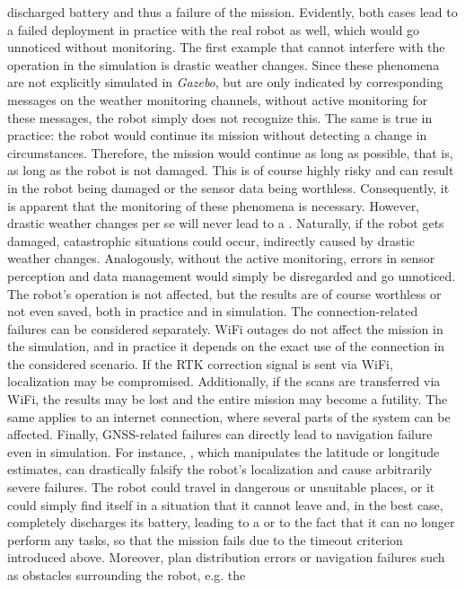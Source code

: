 \documentclass[english, master, utf8]{base/thesis_KBS}
\newcommand{\code}{\collectverb{\codebox}}
\begin{document}
discharged battery and thus a failure of the mission. Evidently, both cases lead to a failed deployment in practice with the real robot as well, which would go unnoticed without
monitoring. The first example that cannot interfere with the operation in the simulation is drastic weather changes. Since these phenomena are not explicitly simulated in
\textit{Gazebo}, but are only indicated by corresponding messages on the weather monitoring channels, without active monitoring for these messages, the robot simply does not recognize
this. The same is true in practice: the robot would continue its mission without detecting a change in circumstances. Therefore, the mission would continue as long as possible, that
is, as long as the robot is not damaged. This is of course highly risky and can result in the robot being damaged or the sensor data being worthless. Consequently, it is apparent that
the monitoring of these phenomena is necessary. However, drastic weather changes per se will never lead to a \code{CATASTROPHE}. Naturally, if the robot gets damaged, catastrophic
situations could occur, indirectly caused by drastic weather changes. Analogously, without the active monitoring, errors in sensor perception and data management would simply be
disregarded and go unnoticed. The robot's operation is not affected, but the results are of course worthless or not even saved, both in practice and in simulation. The
connection-related failures can be considered separately. WiFi outages do not affect the mission in the simulation, and in practice it depends on the exact use of the connection in
the considered scenario. If the RTK correction signal is sent via WiFi, localization may be compromised.  Additionally, if the scans are transferred via WiFi, the results may be lost
and the entire mission may become a futility. The same applies to an internet connection, where several parts of the system can be affected. Finally, GNSS-related failures can
directly lead to navigation failure even in simulation. For instance, \code{/toggle_simulated_teleport}, which manipulates the latitude or longitude estimates, can drastically
falsify the robot's localization and cause arbitrarily severe failures. The robot could travel in dangerous or unsuitable places, or it could simply find itself in a situation that it
cannot leave and, in the best case, completely discharges its battery, leading to a \code{CATASTROPHE} or to the fact that it can no longer perform any tasks, so that the mission fails
due to the timeout criterion introduced above. Moreover, plan distribution errors or navigation failures such as obstacles surrounding the robot, e.g. the 
\end{document}
